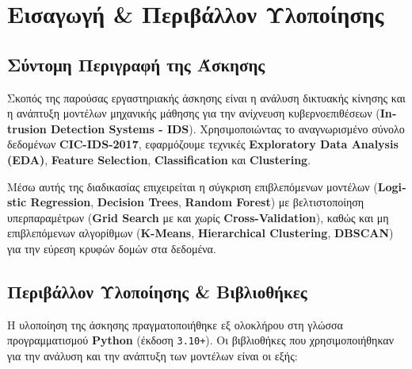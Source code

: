 \documentclass[11pt,a4paper]{article}
\newcommand{\eng}[1]{\textlatin{#1}}
\begin{document}
\newpage

\tableofcontents
\newpage

\section{Εισαγωγή \& Περιβάλλον Υλοποίησης}

\subsection{Σύντομη Περιγραφή της Άσκησης}
Σκοπός της παρούσας εργαστηριακής άσκησης είναι η ανάλυση δικτυακής κίνησης και η ανάπτυξη μοντέλων μηχανικής μάθησης για την ανίχνευση κυβερνοεπιθέσεων (\textbf{\eng{Intrusion Detection Systems - IDS}}). Χρησιμοποιώντας το αναγνωρισμένο σύνολο δεδομένων \textbf{\eng{CIC-IDS-2017}}, εφαρμόζουμε τεχνικές \textbf{\eng{Exploratory Data Analysis (EDA)}}, \textbf{\eng{Feature Selection}}, \textbf{\eng{Classification}} και \textbf{\eng{Clustering}}.

Μέσω αυτής της διαδικασίας επιχειρείται η σύγκριση επιβλεπόμενων μοντέλων (\textbf{\eng{Logistic Regression}}, \textbf{\eng{Decision Trees}}, \textbf{\eng{Random Forest}}) με βελτιστοποίηση υπερπαραμέτρων (\textbf{\eng{Grid Search}} με και χωρίς \textbf{\eng{Cross-Validation}}), καθώς και μη επιβλεπόμενων αλγορίθμων (\textbf{\eng{K-Means}}, \textbf{\eng{Hierarchical Clustering}}, \textbf{\eng{DBSCAN}}) για την εύρεση κρυφών δομών στα δεδομένα.

\subsection{Περιβάλλον Υλοποίησης \& Βιβλιοθήκες}
Η υλοποίηση της άσκησης πραγματοποιήθηκε εξ ολοκλήρου στη γλώσσα προγραμματισμού \textbf{\eng{Python}} (έκδοση \texttt{\eng{3.10+}}). Οι βιβλιοθήκες που χρησιμοποιήθηκαν για την ανάλυση και την ανάπτυξη των μοντέλων είναι οι εξής:
\end{document}
